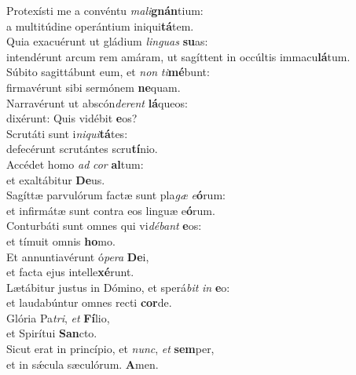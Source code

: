 \evenverse Protexísti me a convéntu \textit{ma}\textit{li}\textbf{gnán}tium:~\*\\
\evenverse a multitúdine operántium iniqui\textbf{tá}tem.\\
\oddverse Quia exacuérunt ut gládium \textit{lin}\textit{guas} \textbf{su}as:~\*\\
\oddverse intendérunt arcum rem amáram, ut sagíttent in occúltis immacu\textbf{lá}tum.\\
\evenverse Súbito sagittábunt eum, et \textit{non} \textit{ti}\textbf{mé}bunt:~\*\\
\evenverse firmavérunt sibi sermónem \textbf{ne}quam.\\
\oddverse Narravérunt ut abscón\textit{de}\textit{rent} \textbf{lá}queos:~\*\\
\oddverse dixérunt: Quis vidébit \textbf{e}os?\\
\evenverse Scrutáti sunt i\textit{ni}\textit{qui}\textbf{tá}tes:~\*\\
\evenverse defecérunt scrutántes scru\textbf{tí}nio.\\
\oddverse Accédet homo \textit{ad} \textit{cor} \textbf{al}tum:~\*\\
\oddverse et exaltábitur \textbf{De}us.\\
\evenverse Sagíttæ parvulórum factæ sunt pla\textit{gæ} \textit{e}\textbf{ó}rum:~\*\\
\evenverse et infirmátæ sunt contra eos linguæ e\textbf{ó}rum.\\
\oddverse Conturbáti sunt omnes qui vi\textit{dé}\textit{bant} \textbf{e}os:~\*\\
\oddverse et tímuit omnis \textbf{ho}mo.\\
\evenverse Et annuntiavérunt ó\textit{pe}\textit{ra} \textbf{De}i,~\*\\
\evenverse et facta ejus intelle\textbf{xé}runt.\\
\oddverse Lætábitur justus in Dómino, et sperá\textit{bit} \textit{in} \textbf{e}o:~\*\\
\oddverse et laudabúntur omnes recti \textbf{cor}de.\\
\evenverse Glória Pa\textit{tri}, \textit{et} \textbf{Fí}lio,~\*\\
\evenverse et Spirítui \textbf{San}cto.\\
\oddverse Sicut erat in princípio, et \textit{nunc}, \textit{et} \textbf{sem}per,~\*\\
\oddverse et in sǽcula sæculórum. \textbf{A}men.\\
